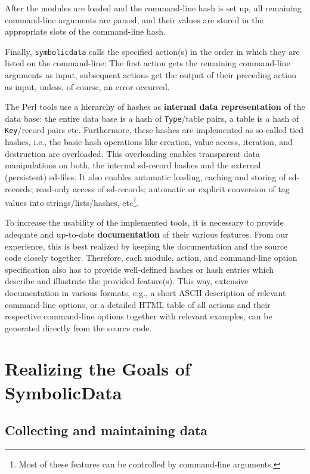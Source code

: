 \documentclass[11pt,a4paper]{article}
\newcommand{\SD}{{\sc Symbolic\-Data}}
\begin{document}
After the modules are loaded and the command-line hash is set up, all
remaining command-line arguments are parsed, and their values are
stored in the appropriate slots of the command-line hash.

Finally, {\tt symbolicdata} calls the specified action(s) in the order
in which they are listed on the command-line: The first action gets
the remaining command-line arguments as input, subsequent actions get
the output of their preceding action as input, unless, of course, an
error occurred.
\medskip

The Perl tools use a hierarchy of hashes as {\bf internal data
  representation} of the data base: the entire data base is a hash of
{\tt Type}/table pairs, a table is a hash of {\tt Key}/record pairs
etc. Furthermore, these hashes are implemented as so-called tied
hashes, i.e., the basic hash operations like creation, value access,
iteration, and destruction are overloaded. This overloading enables
transparent data manipulations on both, the internal sd-record hashes
and the external (persistent) sd-files. It also enables automatic loading,
caching and storing of sd-records; read-only access of sd-records;
automatic or explicit conversion of tag values into
strings/lists/hashes, etc\footnote{Most of these features
  can be controlled by command-line arguments.}.

To increase the usability of the implemented tools, it is necessary to
provide adequate and up-to-date {\bf documentation} of their various
features. From our experience, this is best realized by keeping the
documentation and the source code closely together. Therefore, each
module, action, and command-line option specification also has to
provide well-defined hashes or hash entries which describe and
illustrate the provided feature(s). This way, extensive documentation
in various formats, e.g., a short ASCII description of relevant
command-line options, or a detailed HTML table of all actions and
their respective command-line options together with relevant examples,
can be generated directly from the source code.

\section{Realizing the Goals of \SD}

\subsection{Collecting and maintaining data}
\end{document}
